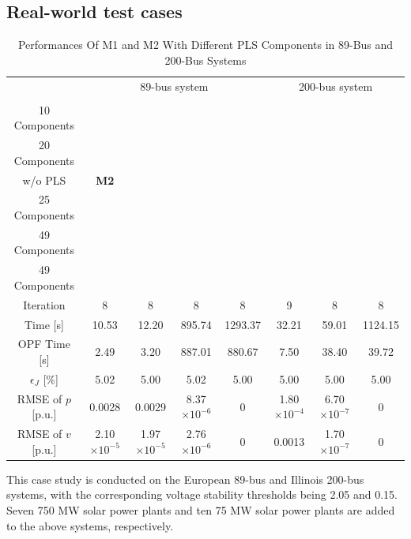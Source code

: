 \documentclass[journal]{IEEEtran}
\theoremstyle{definition}
\theoremstyle{remark}
\begin{document}
\subsection{Real-world test cases}\label{large}
\begin{table}[t]
    \centering
\caption{Performances Of M1 and M2 With Different PLS Components in 89-Bus and 200-Bus Systems}
\label{tab:2}
\renewcommand{\arraystretch}{1}
\begin{tabular}{cccccccc} 
\toprule
\multicolumn{1}{c|}{}&\multicolumn{4}{c}{89-bus system} & \multicolumn{3}{c}{200-bus system}\\
\multicolumn{1}{c|}{} &\shortstack{\textbf{M1}\\10 Components} &\shortstack{\textbf{M1}\\20 Components} &\shortstack{\textbf{M1}\\w/o PLS} &\multicolumn{1}{c|}{\textbf{M2}} &\shortstack{\textbf{M1}\\25 Components}&\shortstack{\textbf{M1}\\49 Components}&\shortstack{\textbf{M2}\\49 Components} \\
\midrule
\multicolumn{1}{c|}{Iteration} & 8 &8 &8 & \multicolumn{1}{c|}{8} &9&8&8\\
\multicolumn{1}{c|}{Time [s]} & 10.53 &12.20 &895.74 & \multicolumn{1}{c|}{1293.37} &32.21&59.01&1124.15\\
\multicolumn{1}{c|}{OPF Time [s]}&2.49&3.20&887.01&\multicolumn{1}{c|}{880.67} &7.50&38.40&39.72\\
\multicolumn{1}{c|}{$\epsilon_J$ [\%]} &5.02&5.00&5.02&\multicolumn{1}{c|}{5.00}&5.00&5.00&5.00\\
\multicolumn{1}{c|}{RMSE of $p$ [p.u.]}&0.0028&0.0029&8.37$\times10^{-6}$&\multicolumn{1}{c|}{0}&1.80$\times10^{-4}$&6.70$\times10^{-7}$&0 \\
\multicolumn{1}{c|}{RMSE of $v$ [p.u.]}&2.10$\times10^{-5}$&1.97$\times10^{-5}$&2.76$\times10^{-6}$&\multicolumn{1}{c|}{0}&0.0013&1.70$\times10^{-7}$&0 \\
\midrule
\end{tabular}
\vspace{-15pt}
\end{table}
This case study is conducted on the European 89-bus and Illinois 200-bus systems, with the corresponding voltage stability thresholds being 2.05 and 0.15. Seven 750 MW solar power plants and ten 75 MW solar power plants are added to the above systems, respectively. 
\end{document}

